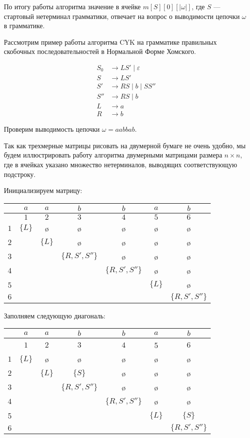 По итогу работы алгоритма значение в ячейке $m[S][0][|\omega|]$, где $S$ --- стартовый нетерминал грамматики, отвечает на вопрос о выводимости цепочки $\omega$ в грамматике. 

\begin{example}
  Рассмотрим пример работы алгоритма CYK на грамматике правильных скобочных последовательностей в Нормальной Форме Хомского. 

  \begin{align*}
    S_0 &\to L S' \mid \varepsilon \\
    S   &\to L S' \\ 
    S'  &\to R S \mid b \mid S S'' \\ 
    S'' &\to R S \mid b \\ 
    L   &\to a \\ 
    R   &\to b 
  \end{align*}

Проверим выводимость цепочки $\omega = a a b b a b$.

Так как трехмерные матрицы рисовать на двумерной бумаге не очень удобно, мы будем иллюстрировать работу алгоритма двумерными матрицами размера $n \times n$, где в ячейках указано множество нетерминалов, выводящих соответствующую подстроку. 

Инициализируем матрицу: 

\begin{center}
  \begin{tabular}{c||cc|cc|cc}
    & $a$ & $a$ & $b$ & $b$ & $a$ & $b$ \\ \hline
    & $1$ & $2$ & $3$ & $4$ & $5$ & $6$ \\ \hline \hline
  $1$ & $\{L\}$ & \o & \o & \o & \o & \o \\ 
  $2$ &   & $\{L\}$ & \o & \o & \o & \o \\ \hline
  $3$ &   &   & $\{R, S', S''\}$ & \o & \o & \o \\ 
  $4$ &   &   &   & $\{R, S', S''\}$ & \o & \o \\ \hline
  5 &   &   &   &   & $\{L\}$ & \o \\ 
  $6$ &   &   &   &   &   & $\{R, S', S''\}$
  \end{tabular}
\end{center}

Заполняем следующую диагональ:

\begin{center}
  \begin{tabular}{c||cc|cc|cc}
    & $a$ & $a$ & $b$ & $b$ & $a$ & $b$ \\ \hline
    & $1$ & $2$ & $3$ & $4$ & 5 & $6$ \\ \hline \hline
  $1$ & $\{L\}$ & \o & \o & \o & \o & \o \\ 
  $2$ &   & $\{L\}$ & $\{S\}$ & \o & \o & \o \\ \hline
  $3$ &   &   & $\{R, S', S''\}$ & \o & \o & \o \\ 
  $4$ &   &   &   & $\{R, S', S''\}$ & \o & \o \\ \hline
  5 &   &   &   &   & $\{L\}$ & $\{S\}$ \\ 
  $6$ &   &   &   &   &   & $\{R, S', S''\}$
  \end{tabular}
\end{center}


\end{example}
